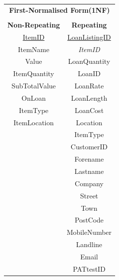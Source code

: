 \newpage

\begin{center}
    \begin{tabular}{|c|c|}
        \hline
        \multicolumn{2}{|c|}{\textbf{First-Normalised Form(1NF)}} \\
        \multicolumn{2}{|c|}{ }                                   \\ \hline
        \textbf{Non-Repeating} & \textbf{Repeating}               \\ \hline
        \underline{ItemID}     & \underline{LoanListingID}        \\ 
        ItemName               & \emph{ItemID}                    \\ 
        Value	                     & LoanQuantity                     \\ 
        ItemQuantity			         & LoanID                           \\
        SubTotalValue                  & LoanRate                         \\ 
        OnLoan           & LoanLength                       \\ 
        ItemType          & LoanCost                         \\ 
       ItemLocation   & Location			\\
		         & ItemType			\\
                               & CustomerID                       \\ 
          	 	          & Forename                         \\ 
               	          & Lastname                         \\ 
                               & Company                          \\ 
                               & Street                           \\ 
                               & Town                             \\ 
                               & PostCode                         \\ 
                               & MobileNumber                     \\ 
                               & Landline                         \\ 
                               & Email                            \\ 
                               & PATtestID                        \\ 

\end{tabular}
\end{center}
